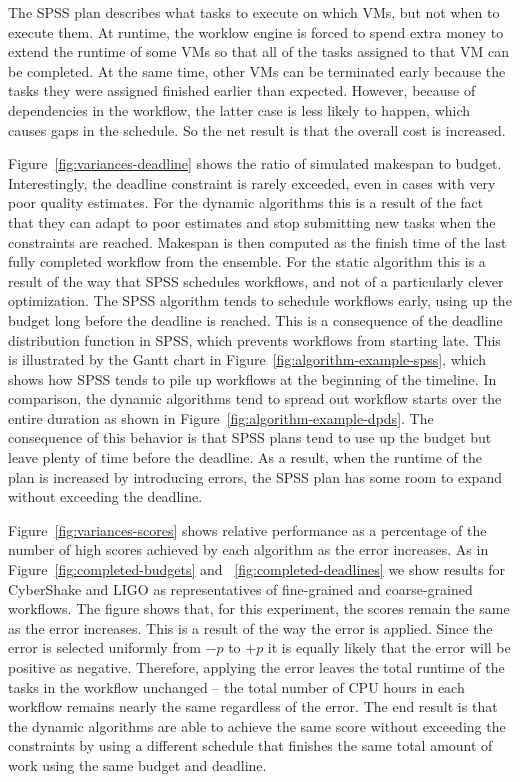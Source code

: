 \documentclass[preprint,5p]{elsarticle}
\begin{document}
The SPSS plan describes what tasks to execute on which VMs, but not when to
execute them. At runtime, the worklow engine is forced to spend extra money
to extend the runtime of some VMs so that all of the tasks assigned to that
VM can be completed. At the same time, other VMs can be terminated early
because the tasks they were assigned finished earlier than expected. However,
because of dependencies in the workflow, the latter case is less likely to
happen, which causes gaps in the schedule. So the net result is that the
overall cost is increased.

Figure~\ref{fig:variances-deadline} shows the ratio of simulated makespan to budget.
Interestingly, the deadline constraint is rarely exceeded, even in cases with
very poor quality estimates. For the dynamic algorithms this is a result of the
fact that they can adapt to poor estimates and stop submitting new tasks when
the constraints are reached. Makespan is then computed as the finish time of the
last fully completed workflow from the ensemble. For the static algorithm this
is a result of the way that SPSS schedules workflows, and not of a particularly
clever optimization. The SPSS algorithm tends to schedule workflows early, using
up the budget long before the deadline is reached. This is a consequence of the
deadline distribution function in SPSS, which prevents workflows from starting
late. This is illustrated by the Gantt chart in
Figure~\ref{fig:algorithm-example-spss}, which shows how SPSS tends to pile up
workflows at the beginning of the timeline.
In comparison, the dynamic algorithms tend to spread out workflow starts over
the entire duration as shown in Figure~\ref{fig:algorithm-example-dpds}. The
consequence of this behavior is that SPSS plans tend to use up the budget but
leave plenty of time before the deadline.
As a result, when the runtime of the plan is increased by introducing errors,
the SPSS plan has some room to expand without exceeding the deadline.


Figure~\ref{fig:variances-scores} shows relative performance as a percentage of
the number of high scores achieved by each algorithm as the error increases. As
in Figure~\ref{fig:completed-budgets} and ~\ref{fig:completed-deadlines} we show
results for CyberShake and LIGO as representatives of fine-grained and
coarse-grained workflows. The figure shows that, for this experiment, the scores remain
the same as the error increases. This is a result of the way the error is
applied. Since the error is selected uniformly from $-p$ to $+p$ it is equally
likely that the error will be positive as negative. Therefore, applying the
error leaves the total runtime of the tasks in the workflow unchanged -- the
total number of CPU hours in each workflow remains nearly the same regardless of
the error. The end result is that the dynamic algorithms are able to achieve the
same score without exceeding the constraints by using a different schedule that
finishes the same total amount of work using the same budget and deadline.
\end{document}
